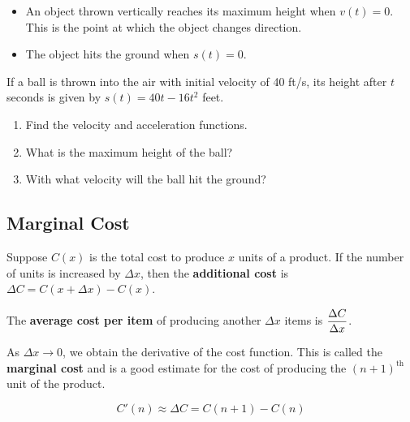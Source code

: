 \documentclass[12pt]{article}
\begin{document}
\begin{itemize}
\item An object thrown vertically reaches its maximum height when $v(t)=0$. This is the point at which the object changes direction.
\item The object hits the ground when $s(t)=0$. 
\end{itemize}

\newpage

\Example If a ball is thrown into the air with initial velocity of 40 ft/s, its height after $t$ seconds is given by $s(t)=40t-16t^2$ feet.

\begin{enumerate}
\item[\tc{1}] Find the velocity and acceleration functions.

\vspace{30mm}

\item[\tc{2}] What is the maximum height of the ball?

\vspace{30mm}

\item[\tc{3}] With what velocity will the ball hit the ground?

\vspace{40mm}

\end{enumerate}

\subsection*{Marginal Cost}

Suppose $C(x)$ is the total cost to produce $x$ units of a product. If the number of units is increased by $\Delta x$, then the \textbf{additional cost} is $\Delta C=C(x+\Delta x)-C(x)$.

\vspace{3mm}

The \textbf{average cost per item} of producing another $\Delta x$ items is $\displaystyle\frac{\Delta C}{\Delta x}$.

\vspace{3mm}

As $\Delta x\to 0$, we obtain the derivative of the cost function. This is called the \textbf{marginal cost} and is a good estimate for the cost of producing the $(n+1)^\text{th}$ unit of the product.

$$C'(n)\approx \Delta C=C(n+1)-C(n)$$
\end{document}
